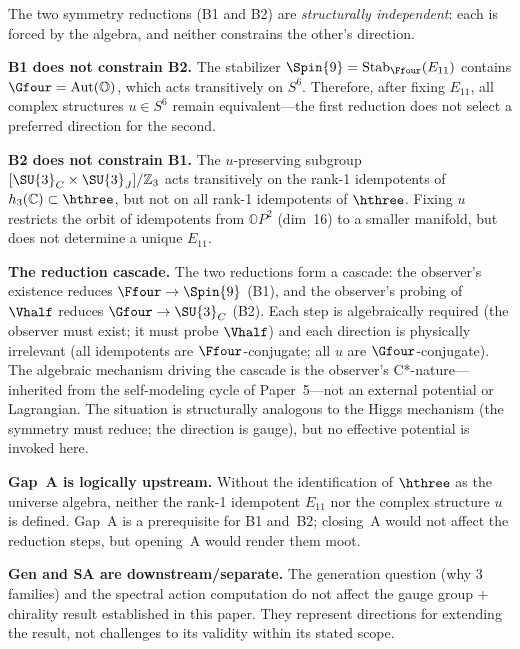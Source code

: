 The two symmetry reductions (B1 and B2) are \emph{structurally independent}:
each is forced by the algebra, and neither constrains the other's
direction.

\medskip
\noindent\textbf{B1 does not constrain B2.}
The stabilizer $\Spin{9} = \mathrm{Stab}_{\Ffour}(E_{11})$ contains
$\Gfour = \mathrm{Aut}(\mathbb{O})$, which acts transitively on
$S^6$.  Therefore, after fixing $E_{11}$, all complex structures
$u\in S^6$ remain equivalent---the first reduction does not select
a preferred direction for the second.

\medskip
\noindent\textbf{B2 does not constrain B1.}
The $u$-preserving subgroup
$[\SU{3}_C\times\SU{3}_J]/\mathbb{Z}_3$ acts transitively on the
rank-1 idempotents of $h_3(\mathbb{C})\subset\hthree$, but not on
all rank-1 idempotents of $\hthree$.  Fixing $u$ restricts the orbit
of idempotents from $\mathbb{O}P^2$ (dim~16) to a smaller manifold,
but does not determine a unique $E_{11}$.

\medskip
\noindent\textbf{The reduction cascade.}
The two reductions form a cascade: the observer's existence reduces
$\Ffour\to\Spin{9}$ (B1), and the observer's probing of $\Vhalf$
reduces $\Gfour\to\SU{3}_C$ (B2).  Each step is algebraically
required (the observer must exist; it must probe $\Vhalf$) and each
direction is physically irrelevant (all idempotents are
$\Ffour$-conjugate; all $u$ are $\Gfour$-conjugate).  The algebraic
mechanism driving the cascade is the observer's C*-nature---inherited
from the self-modeling cycle of Paper~5---not an external potential or
Lagrangian.  The situation is structurally analogous to the Higgs
mechanism (the symmetry must reduce; the direction is gauge), but
no effective potential is invoked here.

\medskip
\noindent\textbf{Gap~A is logically upstream.}
Without the identification of $\hthree$ as the universe algebra,
neither the rank-1 idempotent $E_{11}$ nor the complex structure
$u$ is defined.  Gap~A is a prerequisite for B1 and~B2;
closing~A would not affect the reduction steps, but opening~A would
render them moot.

\medskip
\noindent\textbf{Gen and SA are downstream/separate.}
The generation question (why 3 families) and the spectral action
computation do not affect the gauge group + chirality result established
in this paper.  They represent directions for extending the result,
not challenges to its validity within its stated scope.
